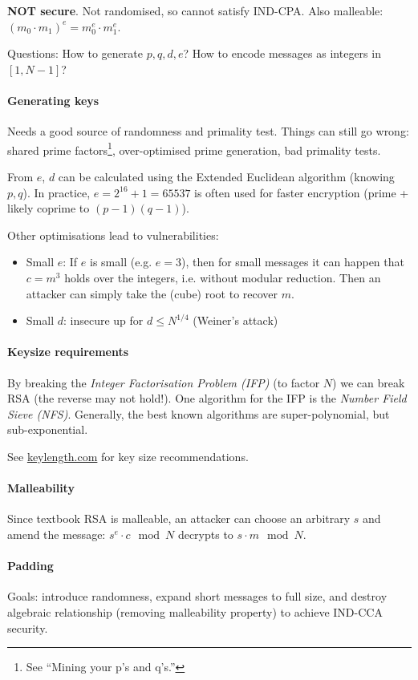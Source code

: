\textbf{NOT secure}.
Not randomised, so cannot satisfy IND-CPA.
Also malleable: $(m_0 \cdot m_1)^e = m_0^e \cdot m_1^e $.

Questions:
How to generate $p, q, d, e$?
How to encode messages as integers in $[1, N-1]$?

\paragraph{Generating keys}
Needs a good source of randomness and primality test.
Things can still go wrong:
shared prime factors\footnote{See ``Mining your p's and q's.''},
over-optimised prime generation, bad primality tests.

From $e$, $d$ can be calculated using the Extended Euclidean algorithm (knowing $p, q$).
In practice, $e = 2^{16}+1 = 65537$ is often used for faster encryption (prime + likely coprime to $(p-1)(q-1)$).

Other optimisations lead to vulnerabilities:
\begin{itemize}
\item Small $e$:
If $e$ is small (e.g. $e=3$), then for small messages it can happen that $c=m^3$ holds over the integers, i.e. without modular reduction.
Then an attacker can simply take the (cube) root to recover $m$.
\item Small $d$:
insecure up for $d \leq N^{1/4}$ (Weiner's attack)
\end{itemize}

\paragraph{Keysize requirements}
By breaking the \emph{Integer Factorisation Problem (IFP)} (to factor $N$) we can break RSA (the reverse may not hold!).
One algorithm for the IFP is the \emph{Number Field Sieve (NFS)}.
Generally, the best known algorithms are super-polynomial, but sub-exponential.

See \href{https://www.keylength.com/}{keylength.com} for key size recommendations.

\paragraph{Malleability}
Since textbook RSA is malleable, an attacker can choose an arbitrary $s$ and amend the message:
$s^e \cdot c \mod N$ decrypts to $s \cdot m \mod N$.

\paragraph{Padding}
Goals:
introduce randomness,
expand short messages to full size,
and destroy algebraic relationship (removing malleability property)
to achieve IND-CCA security.

